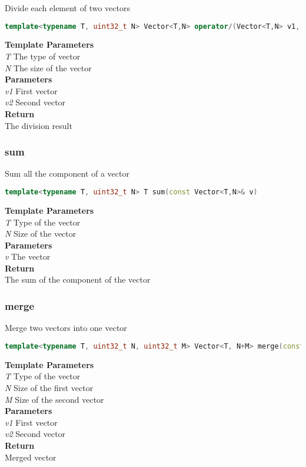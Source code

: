 \begin{mdframed}
Divide each element of two vectors
\begin{lstlisting}[language=C++]
template<typename T, uint32_t N> Vector<T,N> operator/(Vector<T,N> v1, const Vector<T,N>& v2) 
\end{lstlisting}
\textbf{Template Parameters} \\ 
\textit{T} The type of vector \\ 
\textit{N} The size of the vector \\ 
\textbf{Parameters} \\ 
\textit{v1} First vector \\ 
\textit{v2} Second vector \\ 
\textbf{Return} \\ 
The division result\\ 
\end{mdframed}

\subsubsection{sum}
\begin{mdframed}
Sum all the component of a vector
\begin{lstlisting}[language=C++]
template<typename T, uint32_t N> T sum(const Vector<T,N>& v) 
\end{lstlisting}
\textbf{Template Parameters} \\ 
\textit{T} Type of the vector \\ 
\textit{N} Size of the vector \\ 
\textbf{Parameters} \\ 
\textit{v} The vector \\ 
\textbf{Return} \\ 
The sum of the component of the vector\\ 
\end{mdframed}

\subsubsection{merge}
\begin{mdframed}
Merge two vectors into one vector
\begin{lstlisting}[language=C++]
template<typename T, uint32_t N, uint32_t M> Vector<T, N+M> merge(const Vector<T,N>& v1, const Vector<T,M>& v2) 
\end{lstlisting}
\textbf{Template Parameters} \\ 
\textit{T} Type of the vector \\ 
\textit{N} Size of the first vector \\ 
\textit{M} Size of the second vector \\ 
\textbf{Parameters} \\ 
\textit{v1} First vector \\ 
\textit{v2} Second vector \\ 
\textbf{Return} \\ 
Merged vector\\ 
\end{mdframed}


